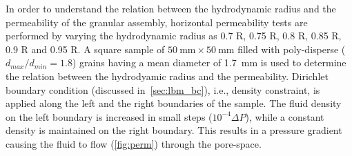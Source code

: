 In order to understand the relation between the hydrodynamic radius and the 
permeability of the granular assembly, horizontal permeability tests are 
performed by varying the hydrodynamic radius as 0.7 R, 0.75 R, 0.8 R, 0.85 R, 
0.9 R and 0.95 R. A square sample of 
$50~\si{\mm} 
\times 50~\si{\mm}$ filled with poly-disperse ($d_{max}/d_{min} = 1.8$) grains 
having a mean diameter of 1.7~\si{\mm} is used to determine the relation 
between the hydrodyamic radius and the permeability. Dirichlet boundary 
condition (discussed in~\cref{sec:lbm_bc}), i.e., density constraint,  
is applied along the left and the right boundaries of the sample. The fluid 
density on the left boundary is increased in small steps ($10^{-4} \Delta P$), 
while a constant density is maintained on the right boundary. This results in a 
pressure gradient causing 
the fluid to flow (\cref{fig:perm}) through the pore-space. 

